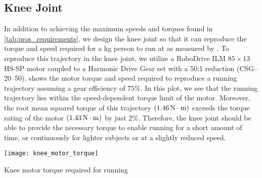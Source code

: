 \subsection{Knee Joint}
\begin{comment}
\begin{marginfigure}[0in]
    \centering \texttt{[image: knee\_running\_torque]}
    \caption{Knee torque required for running}\label{fig:knee_running_torque}
\end{marginfigure}
\begin{marginfigure}[0in]
    \centering \texttt{[image: knee\_running\_speed]}
    \caption{Knee torque required for running}\label{fig:knee_running_speed}
\end{marginfigure}
\end{comment}

In addition to achieving the maximum speeds and torques found in
\cref{tab:pros_requirements}, we design the knee joint so that it can reproduce
the torque and speed required for a \unit[80]{kg} person to run at
 as measured by \citet{novacheck1998biomechanics}. To
reproduce this trajectory in the knee joint, we utilize a RoboDrive ILM
$85\times13$ HS-SP motor coupled to a Harmonic Drive Gear set with a 50:1
reduction (CSG--20--50).  shows the motor torque
and speed required to reproduce a running trajectory assuming a gear
efficiency of $75\%$. In this plot, we see that the running trajectory lies
within the speed-dependent torque limit of the motor. Moreover, the root mean
squared torque of this trajectory $(\unit[1.46]{N \cdot m})$ exceeds the torque
rating of the motor $(\unit[1.43]{N \cdot m})$ by just $2\%$. Therefore, the
knee joint should be able to provide the necessary torque to enable running for
a short amount of time, or continuously for lighter subjects or at a slightly
reduced speed.
\begin{marginfigure}[-2in]
    \centering 
    \texttt{[image: knee\_motor\_torque]}
    \caption{Knee motor torque required for
    running}\label{fig:knee_torque_vs_angle}
\end{marginfigure}

